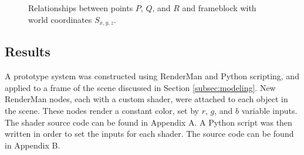 \documentclass[conference]{IEEEtran}
\begin{document}
\begin{adjustwidth}{2.5em}{0pt}
\begin{figure}[h!]
\begin{center}
\end{center}
\caption{Relationships between points $P$, $Q$, and $R$ and frameblock with world coordinates $S_{x,y,z}$.}
\label{fig:distances}
\end{figure}
\end{adjustwidth}

\subsection{Results}
A prototype system was constructed using RenderMan
and Python scripting, and applied to a frame of the scene discussed in
Section \ref{subsec:modeling}.
New RenderMan nodes, each with a custom shader, were attached to each object in the scene.
These nodes render a constant color, set by $r$, $g$, and $b$ variable inputs.
The shader source code can be found in Appendix A.
A Python script was then written in order to set the inputs for each shader.
The source code can be found in Appendix B.
\end{document}

